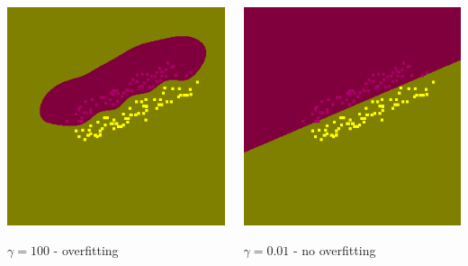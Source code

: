 \documentclass[c]{beamer}
\begin{document}
\begin{frame}
\begin{itemize}
\begin{columns}
 \begin{column}{0.5\textwidth}
  \begin{overlayarea}{\linewidth}{2cm}
    \centering\vfill
     \includegraphics[scale=0.17]{../4_classification/images/svm/svm_g_100.png}
  \end{overlayarea}
  \begin{overlayarea}{\linewidth}{0.5cm}
    \centering
    \tiny $\gamma=100$ - overfitting\par
  \end{overlayarea}
 \end{column}
 \begin{column}{0.5\textwidth}
  \begin{overlayarea}{\linewidth}{2cm}
    \centering\vfill
    \includegraphics[scale=0.17]{../4_classification/images/svm/svm_g_001.png}
  \end{overlayarea}
  \begin{overlayarea}{\linewidth}{0.5cm}
    \centering
    \tiny  $\gamma=0.01$ - no overfitting\par
  \end{overlayarea}
 \end{column}
\end{columns}

\end{itemize}
\end{frame}
\end{document}
